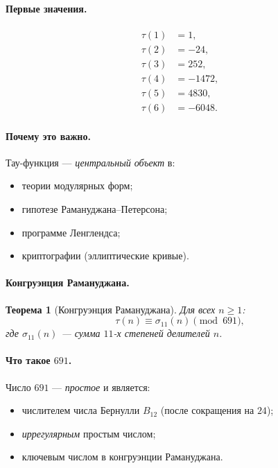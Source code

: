 \documentclass[11pt,a4paper]{article}
\newtheorem{theorem}{Теорема}[section]
\theoremstyle{definition}
\begin{document}
\paragraph{Первые значения.}
\begin{align}
    \tau(1) &= 1, \\
    \tau(2) &= -24, \\
    \tau(3) &= 252, \\
    \tau(4) &= -1472, \\
    \tau(5) &= 4830, \\
    \tau(6) &= -6048.
\end{align}

\paragraph{Почему это важно.}
Тау-функция — \emph{центральный объект} в:
\begin{itemize}
    \item теории модулярных форм;
    \item гипотезе Рамануджана--Петерсона;
    \item программе Ленглендса;
    \item криптографии (эллиптические кривые).
\end{itemize}

\paragraph{Конгруэнция Рамануджана.}
\begin{theorem}[Конгруэнция Рамануджана]
\label{thm:ramanujan-congruence}
Для всех $n \geq 1$:
\begin{equation}
    \boxed{
    \tau(n) \equiv \sigma_{11}(n) \pmod{691},
    }
    \label{eq:ramanujan-congruence}
\end{equation}
где $\sigma_{11}(n)$ — сумма $11$-х степеней делителей $n$.
\end{theorem}

\paragraph{Что такое $691$.}
Число $691$ — \emph{простое} и является:
\begin{itemize}
    \item числителем числа Бернулли $B_{12}$ 
          (после сокращения на $24$);
    \item \emph{иррегулярным} простым числом;
    \item ключевым числом в конгруэнции Рамануджана.
\end{itemize}
\end{document}
